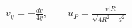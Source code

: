 \documentclass[border=2.5pt]{standalone}
\begin{document}
$\displaystyle v_y=-\frac{dv}{4y},\qquad \boxed{u_P=\frac{|v|R}{\sqrt{4R^2-d^2}}}$
\end{document}
